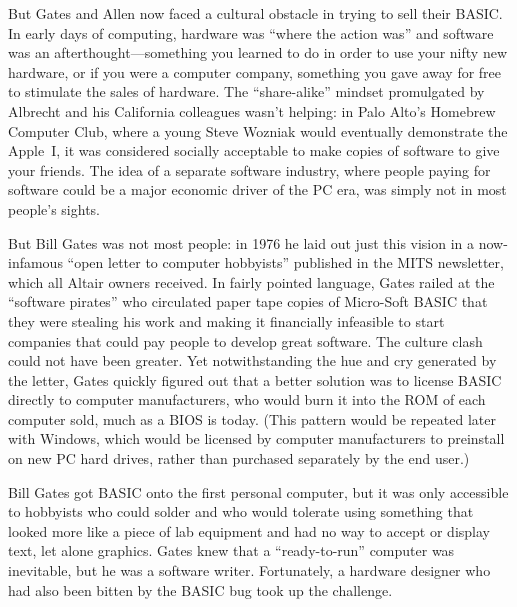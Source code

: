 But Gates and Allen now faced a cultural obstacle in trying to sell their
BASIC.
In early days of computing, hardware was ``where the action was'' and
software was an afterthought---something you learned to do in order to
use your nifty new hardware, or if you were a computer company,
something you gave away for free to stimulate the sales of hardware.
The ``share-alike'' mindset promulgated by Albrecht and his California
colleagues wasn't helping:
in Palo Alto's Homebrew
Computer Club, where a young Steve Wozniak would
eventually demonstrate the Apple~I, it
was considered socially acceptable to
make copies of software  to give your friends.
The idea of a separate software industry, where
people paying for software could be a major economic driver of the PC era,
was simply not in most people's sights.  

But Bill Gates was not most people: in 1976 he laid out just this vision
in a now-infamous ``open letter to computer hobbyists'' published in the
MITS newsletter, which all Altair owners received.
In fairly pointed language, Gates railed at the ``software pirates'' who
circulated paper tape copies of Micro-Soft BASIC that they were stealing
his work and making it financially infeasible to start companies that
could pay people to develop great software.
The culture clash could not have been greater.
Yet notwithstanding the hue and cry generated by the letter, Gates
quickly figured out that a better solution was to license BASIC directly
to computer manufacturers, who would burn it into the ROM of each
computer sold, much as a BIOS is today.
(This pattern would be repeated later with Windows, which would be
licensed by computer manufacturers to preinstall on new PC hard drives,
rather than purchased separately by the end user.)

Bill Gates got BASIC onto the first personal computer, but it was only
accessible to hobbyists who could solder and who would tolerate using
something that looked more like a piece of lab equipment and had no way
to accept or display text, let alone graphics.
Gates knew that a ``ready-to-run'' computer was inevitable, but he was a
software writer.  Fortunately, a hardware designer who had also been
bitten by the BASIC bug took up the challenge.



